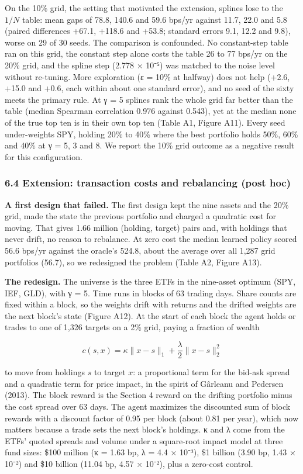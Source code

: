 \documentclass[
  11pt]{article}
\newcounter{none} %
\begin{document}
On the 10\% grid, the setting that motivated the extension, splines lose
to the \(1/N\) table: mean gaps of 78.8, 140.6 and 59.6 bps/yr against
11.7, 22.0 and 5.8 (paired differences +67.1, +118.6 and +53.8; standard
errors 9.1, 12.2 and 9.8), worse on 29 of 30 seeds. The comparison is
confounded. No constant-step table ran on this grid, the constant step
alone costs the table 26 to 77 bps/yr on the 20\% grid, and the spline
step (2.778 × 10⁻⁵) was matched to the noise level without re-tuning.
More exploration (ε = 10\% at halfway) does not help (+2.6, +15.0 and
+0.6, each within about one standard error), and no seed of the sixty
meets the primary rule. At γ = 5 splines rank the whole grid far better
than the table (median Spearman correlation 0.976 against 0.543), yet at
the median none of the true top ten is in their own top ten (Table A1,
Figure A11). Every seed under-weights SPY, holding 20\% to 40\% where
the best portfolio holds 50\%, 60\% and 40\% at γ = 5, 3 and 8. We
report the 10\% grid outcome as a negative result for this
configuration.

\subsubsection{6.4 Extension: transaction costs and rebalancing (post
hoc)}\label{extension-transaction-costs-and-rebalancing-post-hoc}

\textbf{A first design that failed.} The first design kept the nine
assets and the 20\% grid, made the state the previous portfolio and
charged a quadratic cost for moving. That gives 1.66 million (holding,
target) pairs and, with holdings that never drift, no reason to
rebalance. At zero cost the median learned policy scored 56.6 bps/yr
against the oracle's 524.8, about the average over all 1,287 grid
portfolios (56.7), so we redesigned the problem (Table A2, Figure A13).

\textbf{The redesign.} The universe is the three ETFs in the nine-asset
optimum (SPY, IEF, GLD), with γ = 5. Time runs in blocks of 63 trading
days. Share counts are fixed within a block, so the weights drift with
returns and the drifted weights are the next block's state (Figure A12).
At the start of each block the agent holds or trades to one of 1,326
targets on a 2\% grid, paying a fraction of wealth

\[c(s, x) = \kappa \lVert x - s \rVert_1 + \frac{\lambda}{2} \lVert x - s \rVert_2^2\]

to move from holdings \(s\) to target \(x\): a proportional term for the
bid-ask spread and a quadratic term for price impact, in the spirit of
Gârleanu and Pedersen (2013). The block reward is the Section 4 reward
on the drifting portfolio minus the cost spread over 63 days. The agent
maximizes the discounted sum of block rewards with a discount factor of
0.95 per block (about 0.81 per year), which now matters because a trade
sets the next block's holdings. κ and λ come from the ETFs' quoted
spreads and volume under a square-root impact model at three fund sizes:
\$100 million (κ = 1.63 bp, λ = 4.4 × 10⁻³), \$1 billion (3.90 bp, 1.43
× 10⁻²) and \$10 billion (11.04 bp, 4.57 × 10⁻²), plus a zero-cost
control.
\end{document}
